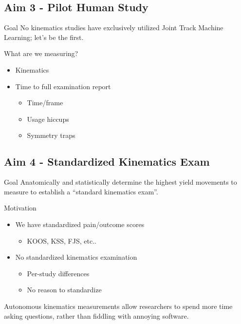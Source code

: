 \documentclass[presentation, aspectratio=1610]{beamer}
\begin{document}
\subsection{Aim 3 - Pilot Human Study}
\label{sec:orgcad91d2}
\begin{frame}[label={sec:orgaa473de}]{Goal}
No kinematics studies have exclusively utilized Joint Track Machine Learning; let's be the first.

What are we measuring?
\begin{itemize}
\item Kinematics
\item Time to full examination report
\begin{itemize}
\item Time/frame
\item Usage hiccups
\item Symmetry traps
\end{itemize}
\end{itemize}
\end{frame}


\subsection{Aim 4 - Standardized Kinematics Exam}
\label{sec:org75b8995}
\begin{frame}[label={sec:org3e1e05d}]{Goal}
Anatomically and statistically determine the highest yield movements to measure to establish a ``standard kinematics exam''.
\end{frame}
\begin{frame}[label={sec:org4ded23e}]{Motivation}
\begin{itemize}
\item We have standardized pain/outcome scores
\begin{itemize}
\item KOOS, KSS, FJS, etc..
\end{itemize}
\item No standardized kinematics examination
\begin{itemize}
\item Per-study differences
\item No reason to standardize
\end{itemize}
\end{itemize}

Autonomous kinematics measurements allow researchers to spend more time asking questions, rather than fiddling with annoying software.
\end{frame}
\end{document}
